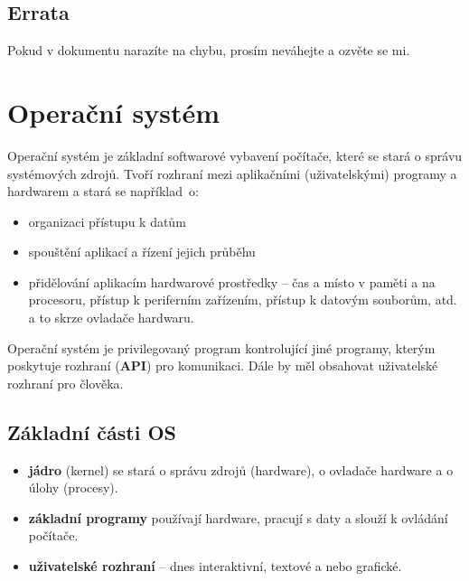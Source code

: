 \documentclass{article}
\begin{document}
\subsection{Errata}
Pokud v dokumentu narazíte na chybu, prosím neváhejte a ozvěte se mi.

\newpage

\section{Operační systém}
Operační systém je základní softwarové vybavení počítače, které se stará o správu systémových zdrojů. Tvoří rozhraní mezi aplikačními (uživatelskými) programy a hardwarem a stará se například~o:

\begin{itemize}
\item organizaci přístupu k datům
\item spouštění aplikací a řízení jejich průběhu
\item přidělování aplikacím hardwarové prostředky -- čas a místo v paměti a na procesoru, přístup k periferním zařízením, přístup k datovým souborům, atd. a to skrze ovladače hardwaru.
\end{itemize}

Operační systém je privilegovaný program kontrolující jiné programy, kterým poskytuje rozhraní (\textbf{API}) pro komunikaci. Dále by měl obsahovat uživatelské rozhraní pro člověka.

\subsection{Základní části OS}
\begin{itemize}
\item \textbf{jádro} (kernel) se stará o správu zdrojů (hardware), o ovladače hardware a o úlohy (procesy).
\item \textbf{základní programy} používají hardware, pracují s daty a slouží k ovládání počítače.
\item \textbf{uživatelské rozhraní} -- dnes interaktivní, textové a nebo grafické.
\end{itemize}
\end{document}
